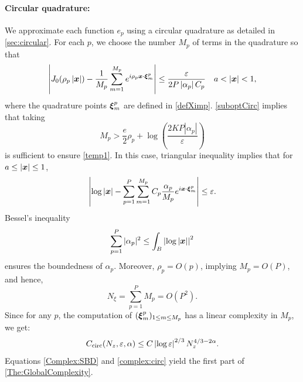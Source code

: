 \documentclass[smallextended]{svjour3}
\begin{document}
\paragraph{Circular quadrature:} We approximate each function $e_p$ using a circular quadrature as detailed in \autoref{sec:circular}. For each $p$, we choose the number $M_p$ of terms in the quadrature so that
\begin{equation}
	\label{temp1}
	\left\lvert J_0 (\rho_p \left\lvert \boldsymbol{x} \right\rvert) - \dfrac{1}{M_p}\sum_{m=1}^{M_p} e^{i \rho_p \boldsymbol{x} \cdot \boldsymbol{\xi}_m^p} \right\rvert \leq \frac{\varepsilon}{2P \left\lvert \alpha_p \right\rvert C_p} \quad a < \left\lvert \boldsymbol{x} \right\rvert < 1,
\end{equation}
where the quadrature points $\boldsymbol{\xi}_m^p$ are defined in  \eqref{defXimp}. \autoref{suboptCirc} implies that taking
\begin{equation}
	M_p > \frac{e}{2} \rho_p + \log\left(\dfrac{2KP |\alpha_p|}{\varepsilon}\right)
\end{equation} 
is sufficient to ensure \eqref{temp1}. In this case, triangular inequality implies that for $a \leq \left\lvert \boldsymbol{x} \right\rvert \leq 1$, 
\[ \left\lvert \log\left\lvert \boldsymbol{x} \right\rvert - \sum_{p=1}^{P} \sum_{m = 1}^{M_p} C_p \frac{\alpha_p}{M_p}e^{i \boldsymbol{x}\cdot \boldsymbol{\xi}^p_m} \right\rvert \leq \varepsilon.\]
Bessel's inequality
\[\sum_{p=1}^P{|\alpha_p|^2} \leq \int_{B} \left\lvert \log|\boldsymbol{x}| \right\rvert^2\]
ensures the boundedness of $\alpha_p$. Moreover, $\rho_p = O(p)$, implying $M_p = O(P)$, and hence, 
\begin{equation}
	\label{eq:NxiEnFonctionDeP}
	N_\xi = \sum_{p = 1}^P M_p = O(P^2).
\end{equation}
Since for any $p$, the computation of $(\boldsymbol{\xi}_m^p)_{1\leq m \leq M_p}$ has a linear complexity in $M_p$, we get:
\begin{equation}
	\label{complex:circ}
	C_{\textup{circ}}(N_z,\varepsilon,\alpha) \leq C \left\lvert \log\varepsilon \right\rvert^{2/3} N_z^{4/3 - 2\alpha}.
\end{equation} 
Equations \eqref{Complex:SBD} and \eqref{complex:circ} yield the first part of \autoref{The:GlobalComplexity}.
																																																		
\end{document}
